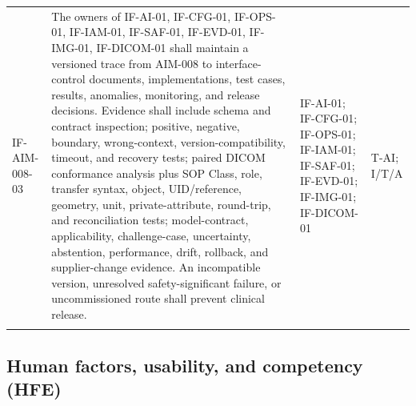 \documentclass[11pt,letterpaper]{article}
\begin{document}
\begin{scriptsize}
\begin{longtable}{@{}L{0.14\textwidth}L{0.49\textwidth}L{0.19\textwidth}L{0.10\textwidth}@{}}
\addlinespace[2pt]
\mbox{IF-AIM-008-03} & The owners of IF-AI-01, IF-CFG-01, IF-OPS-01, IF-IAM-01, IF-SAF-01, IF-EVD-01, IF-IMG-01, IF-DICOM-01 shall maintain a versioned trace from AIM-008 to interface-control documents, implementations, test cases, results, anomalies, monitoring, and release decisions. Evidence shall include schema and contract inspection; positive, negative, boundary, wrong-context, version-compatibility, timeout, and recovery tests; paired DICOM conformance analysis plus SOP Class, role, transfer syntax, object, UID\slash\allowbreak{}reference, geometry, unit, private-attribute, round-trip, and reconciliation tests; model-contract, applicability, challenge-case, uncertainty, abstention, performance, drift, rollback, and supplier-change evidence. An incompatible version, unresolved safety-significant failure, or uncommissioned route shall prevent clinical release. & IF-AI-01; IF-CFG-01; IF-OPS-01; IF-IAM-01; IF-SAF-01; IF-EVD-01; IF-IMG-01; IF-DICOM-01 & T-AI; I\slash\allowbreak{}T\slash\allowbreak{}A \\
\addlinespace[2pt]
\end{longtable}
\end{scriptsize}

\subsection{Human factors, usability, and competency (HFE)}
\end{document}
